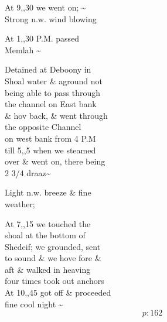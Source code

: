 \documentclass{report}
\begin{document}
	\par{
 	At 9,,30 we went on; \~{}\ \\Strong n.w. wind blowing\ \\
	}

	\par{
 	At 1,,30 P.M. passed\ \\Memlah \~{}\ \\
	}

	\par{
 	Detained at Deboony in\ \\Shoal water \& aground not\ \\being able to pass through\ \\the channel on East bank\ \\\& hov back, \& went through\ \\the opposite Channel\ \\on west bank from 4 P.M\ \\till 5,,5 when we steamed\ \\over \& went on, there being\ \\2 3/4 draaz\~{}\ \\
	}

	\par{
 	Light n.w. breeze \& fine\ \\weather;\ \\
	}

	\par{
 	At 7,,15 we touched the\ \\shoal at the bottom of\ \\Shedeif; we grounded, sent\ \\to sound \& we hove fore \&\ \\aft \& walked in heaving\ \\four times took out anchors\ \\At 10,,45 got off \& proceeded\ \\fine cool night \~{}\ \\
  \[p: 162 \]

	}



\end{document}
